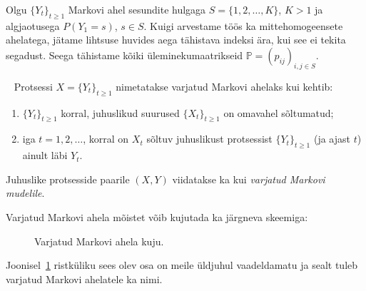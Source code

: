 Olgu $\{Y_t\}_{t\geq1}$ Markovi ahel sesundite hulgaga $S = \{1,2,\dots,K\}$, $K>1$ ja algjaotusega $P(Y_1=s)$, $s \in S$. Kuigi arvestame töös ka mittehomogeensete ahelatega, jätame lihtsuse huvides aega tähistava indeksi ära, kui see ei tekita segadust. Seega tähistame kõiki üleminekumaatrikseid $\mathbb{P} = (p_{ij})_{i,j \in S}$.


\begin{definition}~\citep{lember10}
	Protsessi $X = \{Y_t\}_{t\geq1}$ nimetatakse varjatud Markovi ahelaks kui kehtib:

	\begin{enumerate}
		\item $\{Y_t\}_{t\geq1}$ korral, juhuslikud suurused $\{X_t\}_{t\geq1}$ on omavahel sõltumatud;
		\item iga $t = 1,2,\dots$, korral on $X_t$ sõltuv juhuslikust protsessist $\{Y_t\}_{t\geq1}$ (ja ajast $t$) ainult läbi $Y_t$.
	\end{enumerate}

	Juhuslike protsesside paarile $(X, Y)$ viidatakse ka kui \textit{varjatud Markovi mudelile}.
\end{definition}

Varjatud Markovi ahela mõistet võib kujutada ka järgneva skeemiga:

\begin{figure}[h]
	\centering
	
	\caption{Varjatud Markovi ahela kuju.}
	\label{fig:HMM}
\end{figure}

Joonisel~\ref{fig:HMM} ristküliku sees olev osa on meile üldjuhul vaadeldamatu ja sealt tuleb varjatud Markovi ahelatele ka nimi.


